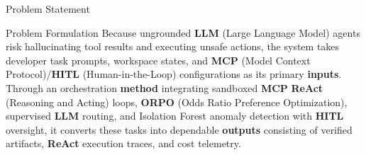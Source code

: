 \documentclass[aspectratio=169,10pt]{beamer}
\begin{document}
\begin{frame}{Problem Statement}
\vspace{0.25cm}
\begin{block}{Problem Formulation}
\normalsize
Because ungrounded \textbf{LLM} (Large Language Model) agents risk hallucinating tool results and executing unsafe actions, the system takes developer task prompts, workspace states, and \textbf{MCP} (Model Context Protocol)/\textbf{HITL} (Human-in-the-Loop) configurations as its primary \textbf{inputs}. Through an orchestration \textbf{method} integrating sandboxed \textbf{MCP} \textbf{ReAct} (Reasoning and Acting) loops, \textbf{ORPO} (Odds Ratio Preference Optimization), supervised \textbf{LLM} routing, and Isolation Forest anomaly detection with \textbf{HITL} oversight, it converts these tasks into dependable \textbf{outputs} consisting of verified artifacts, \textbf{ReAct} execution traces, and cost telemetry.
\end{block}
\end{frame}
\end{document}
